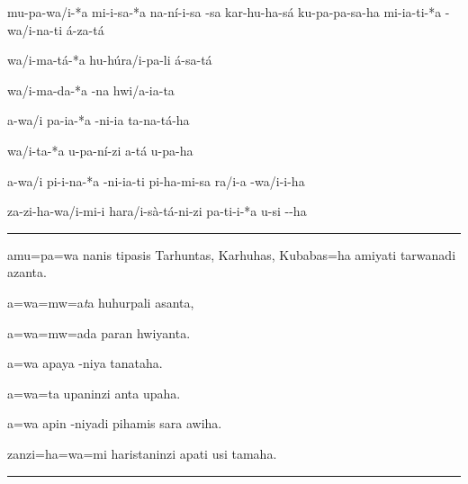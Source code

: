 \setcounter{parcount}{8}
\begin{parnumbersa}[]

	\raggedright%
	\itshape%

	mu-pa-wa/i-*a mi-i-sa-*a na-ní-i-sa \lbreak{}  -sa kar-hu-ha-sá ku-pa-pa-sa-ha mi-ia-ti-*a -wa/i-na-ti á-za-tá

	wa/i-ma-tá-*a hu-hú\logo{+}ra/i-pa-li \lmasc{}á-sa-tá

	wa/i-ma-da-*a \lmasc{}-na hwi/a-ia-ta

	a-wa/i pa-ia-*a \lmasc{}-ni-ia ta-na-tá-ha

	wa/i-ta-*a u-pa-ní-zi a-tá \lmasc{}\lbreak{}u-pa-ha

	a-wa/i pi-i-na-*a \lmasc{}-ni-ia-ti pi-ha-mi-sa ra/i-a \lmasc{}-wa/i-i-ha

	\lmasc{}za-zi-ha-wa/i-mi-i ha\logo{+}ra/i-sà-tá-ni-zi pa-ti-i-*a u-si \lmasc{}--ha


\end{parnumbersa}

\vspace{10pt}
\hrule
\vspace{10pt}


\setcounter{parcount}{8}
\begin{parnumbersa}[]

	\raggedright%
	\itshape%

	amu=pa=wa nanis tipasis Tarhuntas, Karhuhas, Kubabas=ha amiyati tarwanadi
	azanta.

	a=wa=mw=a\emph{t}a huhurpali asanta,

	a=wa=mw=ada paran hwiyanta.

	a=wa apaya -niya tanataha.

	a=wa=ta upaninzi anta upaha.

	a=wa apin -niyadi pihamis sara awiha.

	zanzi=ha=wa=mi haristaninzi apati usi tamaha.



\end{parnumbersa}

\vspace{10pt}
\hrule
\vspace{10pt}


